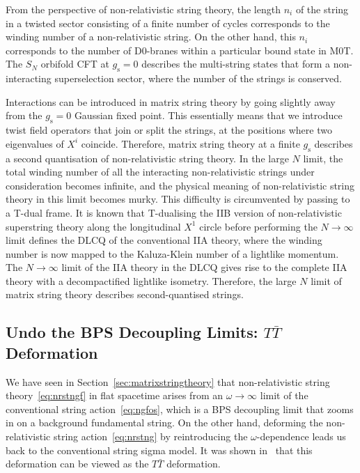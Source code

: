 \documentclass[11pt]{article}
\begin{document}
From the perspective of non-relativistic string theory, the length $n_i$ of the string in a twisted sector consisting of a finite number of cycles corresponds to the winding number of a non-relativistic string. On the other hand, this $n_i$ corresponds to the number of D0-branes within a particular bound state in M0T. The $S_N$ orbifold CFT at $g^{}_\text{s} = 0$ describes the multi-string states that form a non-interacting superselection sector, where the number of the strings is conserved. 

Interactions can be introduced in matrix string theory by going slightly away from the $g^{}_\text{s} = 0$ Gaussian fixed point. This essentially means that we introduce twist field operators that join or split the strings, at the positions where two eigenvalues of $X^i$ coincide. Therefore, matrix string theory at a finite $g^{}_\text{s}$ describes a second quantisation of non-relativistic string theory. In the large $N$ limit, the total winding number of all the interacting non-relativistic strings under consideration becomes infinite, and the physical meaning of non-relativistic string theory in this limit becomes murky. This difficulty is circumvented by passing to a T-dual frame. It is known that T-dualising the IIB version of non-relativistic superstring theory along the longitudinal $X^1$ circle before performing the $N \rightarrow \infty$ limit defines the DLCQ of the conventional IIA theory, where the winding number is now mapped to the Kaluza-Klein number of a lightlike momentum. The $N \rightarrow \infty$ limit of the IIA theory in the DLCQ gives rise to the complete IIA theory with a decompactified lightlike isometry. Therefore, the large $N$ limit of matrix string theory describes second-quantised strings. 



\subsection{Undo the BPS Decoupling Limits: \texorpdfstring{$T\bar{T}$}{TTbar} Deformation}
\label{sec:TTbarNG} 

We have seen in Section~\ref{sec:matrixstringtheory} that non-relativistic string theory~\eqref{eq:nrstngf} in flat spacetime arises from an $\omega \rightarrow \infty$ limit of the conventional string action~\eqref{eq:ngfos}, which is a BPS decoupling limit that zooms in on a background fundamental string. On the other hand, deforming the non-relativistic string action~\eqref{eq:nrstng} by reintroducing the $\omega$-dependence leads us back to the conventional string sigma model. It was shown in~\cite{Blair:2020ops} that this deformation can be viewed as the $T\bar{T}$ deformation.
\end{document}
